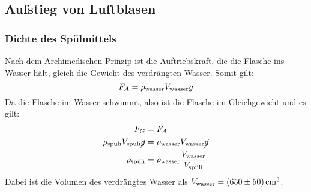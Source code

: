 \subsection{Aufstieg von Luftblasen}
	\subsubsection{Dichte des Spülmittels}
		Nach dem Archimedischen Prinzip ist die Auftriebskraft, die die Flasche ins Wasser hält, gleich die Gewicht des verdrängten Wasser. Somit gilt:
		\begin{equation}
			F_A = \rho_\wasser V_\wasser g
		\end{equation}
		Da die Flasche im Wasser schwimmt, also ist die Flasche im Gleichgewicht und es gilt:
		\begin{align}
			F_G &= F_A \\
			\rho_\spuli V_\spuli \cancel{g} &= \rho_\wasser V_\wasser \cancel{g} \\
			\rho_\spuli &= \rho_\wasser \frac{V_\wasser}{V_\spuli}
		\end{align}
		Dabei ist die Volumen des verdrängtes Wasser als $V_\wasser = \SI{650(50)}{\centi\meter\cubed}$.

